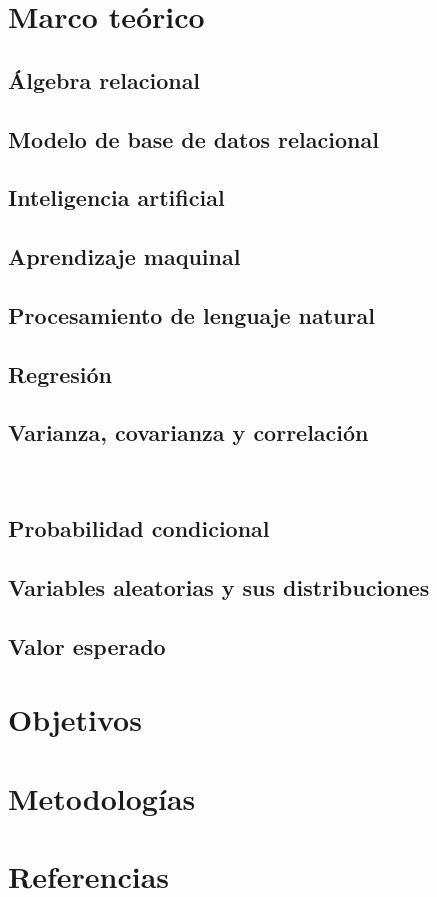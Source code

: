 \documentclass[12pt,letterpaper]{article}
\begin{document}
%
\tableofcontents
\pagebreak
\section {Marco teórico}\label{sec:marcot}
\subsection {Álgebra relacional}\label{subsec:algebra}
\subsection {Modelo de base de datos relacional}\label{subsch:rdb}
\subsection {Inteligencia artificial}\label{subsec:intela}
\subsection {Aprendizaje maquinal}\label{subsec:machinel}
\subsection {Procesamiento de lenguaje natural}\label{subsec:nlp}
\subsection {Regresión}\label{subsec:corrl}%
\subsection {Varianza, covarianza y correlación}\label{subsec:reg1}\\
\subsection {Probabilidad condicional}\label{subsec:pcond}
\subsection {Variables aleatorias y sus distribuciones}\label{subsec:vayd}
\subsection {Valor esperado}\label{subsec:valesp}
\section {Objetivos}\label{sec:objetivos}
\section {Metodologías}\label{sec:metod}
\section {Referencias}
\label{sec:refs}
\printbibliography[heading=none]
\end{document}

